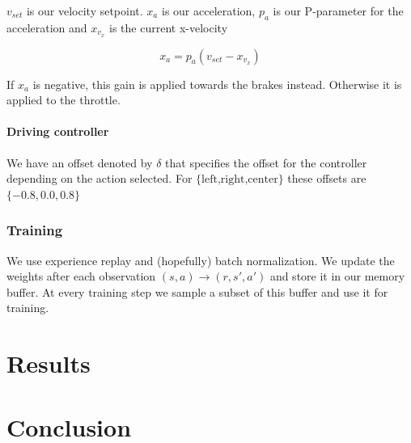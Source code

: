 \documentclass{article}
\begin{document}
$v_{set}$ is our velocity setpoint. $x_a$ is our acceleration, $p_a$ is our P-parameter for the acceleration and $x_{v_x}$ is the current x-velocity

\[
	x_a = p_a (v_{set} - x_{v_x})
\]

If $x_a$ is negative, this gain is applied towards the brakes instead. Otherwise it is applied to the throttle.

\paragraph{Driving controller}

We have an offset denoted by $\delta$ that specifies the offset for the controller depending on the action selected. For ${\text{\{left,right,center}\}}$ these offsets are $\{-0.8, 0.0, 0.8\}$

\subsubsection{Training}

We use experience replay and (hopefully) batch normalization. We update the weights after each observation $(s,a) \rightarrow (r,s',a')$ and store it in our memory buffer. At every training step we sample a subset of this buffer and use it for training.

\section{Results}

\section{Conclusion}
\end{document}
